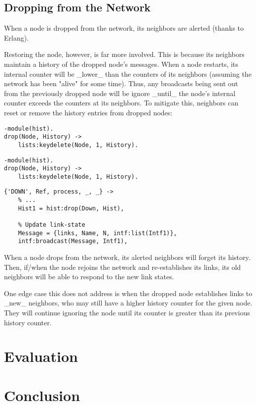 \documentclass[a4paper, 11pt]{article}
\begin{document}
\subsection{Dropping from the Network}
When a node is dropped from the network, its neighbors are alerted (thanks to Erlang).

Restoring the node, however, is far more involved. This is because its neighbors maintain a history of the dropped node's messages. When a node restarts, its internal counter will be _lower_ than the counters of its neighbors (assuming the network has been "alive" for some time). Thus, any broadcasts being sent out from the previously dropped node will be ignore _until_ the node's internal counter exceeds the counters at its neighbors. To mitigate this, neighbors can reset or remove the history entries from dropped nodes:

\begin{verbatim}
-module(hist).
drop(Node, History) ->
    lists:keydelete(Node, 1, History).
\end{verbatim}

\begin{verbatim}
-module(hist).
drop(Node, History) ->
    lists:keydelete(Node, 1, History).
\end{verbatim}

\begin{verbatim}
{'DOWN', Ref, process, _, _} ->
    % ...
    Hist1 = hist:drop(Down, Hist),

    % Update link-state
    Message = {links, Name, N, intf:list(Intf1)},
    intf:broadcast(Message, Intf1),
\end{verbatim}

When a node drops from the network, its alerted neighbors will forget its history. Then, if/when the node rejoins the network and re-establishes its links, its old neighbors will be able to respond to the new link states.

One edge case this does not address is when the dropped node establishes links to _new_ neighbors, who may still have a higher history counter for the given node. They will continue ignoring the node until its counter is greater than its previous history counter.

\section{Evaluation}
\section{Conclusion}
\end{document}
